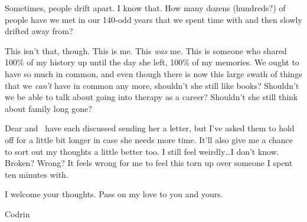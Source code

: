 Sometimes, people drift apart. I know that. How many dozens (hundreds?) of people have we met in our 140-odd years that we spent time with and then slowly drifted away from?

This isn't that, though. This is me. This \emph{was} me. This is someone who shared 100\% of my history up until the day she left, 100\% of my memories. We ought to have so much in common, and even though there is now this large swath of things that we \emph{can't} have in common any more, shouldn't she still like books? Shouldn't we be able to talk about going into therapy as a career? Shouldn't she still think about family long gone?

Dear and \Partner\ have each discussed sending her a letter, but I've asked them to hold off for a little bit longer in case she needs more time. It'll also give me a chance to sort out my thoughts a little better too. I still feel weirdly\ldots I don't know. Broken? Wrong? It feels wrong for me to feel this torn up over someone I spent ten minutes with.

I welcome your thoughts. Pass on my love to you and yours.

Codrin
